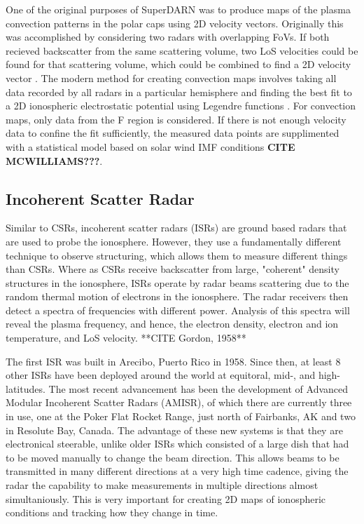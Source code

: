 One of the original purposes of SuperDARN was to produce maps of the plasma convection patterns in the polar caps using 2D velocity vectors.  Originally this was accomplished by considering two radars with overlapping FoVs.  If both recieved backscatter from the same scattering volume, two LoS velocities could be found for that scattering volume, which could be combined to find a 2D velocity vector \citep{Ruohoniemi1989}.  The modern method for creating convection maps involves taking all data recorded by all radars in a particular hemisphere and finding the best fit to a 2D ionospheric electrostatic potential using Legendre functions \citep{Ruohonomiemi1998}.  For convection maps, only data from the F region is considered.  If there is not enough velocity data to confine the fit sufficiently, the measured data points are supplimented with a statistical model based on solar wind IMF conditions \textbf{CITE MCWILLIAMS???}.


\subsection{Incoherent Scatter Radar}
\label{sec:isr}
Similar to CSRs, incoherent scatter radars (ISRs) are ground based radars that are used to probe the ionosphere.  However, they use a fundamentally different technique to observe structuring, which allows them to measure different things than CSRs.  Where as CSRs receive backscatter from large, "coherent" density structures in the ionosphere, ISRs operate by radar beams scattering due to the random thermal motion of electrons in the ionosphere.  The radar receivers then detect a spectra of frequencies with different power.  Analysis of this spectra will reveal the plasma frequency, and hence, the electron density, electron and ion temperature, and LoS velocity.
**CITE Gordon, 1958**

The first ISR was built in Arecibo, Puerto Rico in 1958.  Since then, at least 8 other ISRs have been deployed around the world at equitoral, mid-, and high-latitudes.  The most recent advancement has been the development of Advanced Modular Incoherent Scatter Radars (AMISR), of which there are currently three in use, one at the Poker Flat Rocket Range, just north of Fairbanks, AK and two in Resolute Bay, Canada.  The advantage of these new systems is that they are electronical steerable, unlike older ISRs which consisted of a large dish that had to be moved manually to change the beam direction.  This allows beams to be transmitted in many different directions at a very high time cadence, giving the radar the capability to make measurements in multiple directions almost simultaniously.  This is very important for creating 2D maps of ionospheric conditions and tracking how they change in time.

